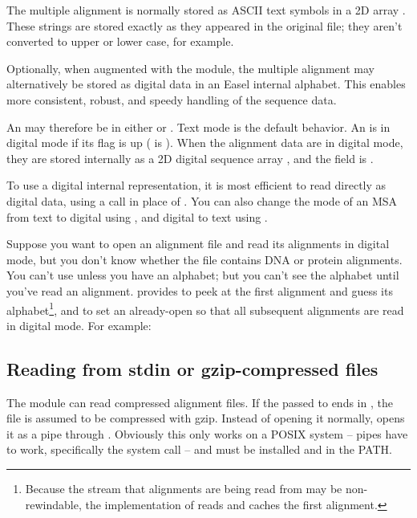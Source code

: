 The multiple alignment is normally stored as ASCII text symbols in a
2D array . These strings are
stored exactly as they appeared in the original file; they aren't
converted to upper or lower case, for example.  

Optionally, when augmented with the  module, the
multiple alignment may alternatively be stored as digital data in an
Easel internal alphabet. This enables more consistent, robust, and
speedy handling of the sequence data.

An  may therefore be in either  or
. Text mode is the default behavior. An
 is in digital mode if its  flag
is up ( is ). When the
alignment data are in digital mode, they are stored internally as a 2D
digital sequence array , and
the  field is .

To use a digital internal representation, it is most efficient to read
directly as digital data, using a 
call in place of . You can also change the
mode of an MSA from text to digital using
, and digital to text using
.

Suppose you want to open an alignment file and read its alignments in
digital mode, but you don't know whether the file contains DNA or
protein alignments. You can't use 
unless you have an alphabet; but you can't see the alphabet until
you've read an alignment. \Easel provides
 to peek at the first alignment
and guess its alphabet\footnote{Because the stream that alignments are
being read from may be non-rewindable, the implementation of
 reads and caches the first
alignment.}, and  to set an
already-open  so that all subsequent alignments
are read in digital mode. For example: 




\subsection{Reading from stdin or gzip-compressed files}

The module can read compressed alignment files.  If the
 passed to  ends in
, the file is assumed to be compressed with gzip. Instead
of opening it normally,  opens it as a pipe
through . Obviously this only works on a POSIX
system -- pipes have to work, specifically the  system
call -- and  must be installed and in the PATH.

